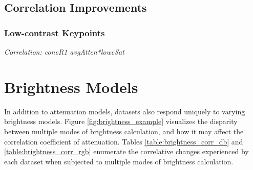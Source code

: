 \documentclass[12pt]{report}
\begin{document}
\subsection{Correlation Improvements}
\subsubsection{Low-contrast Keypoints}
\textit{Correlation: coneR1 avgAtten*lowcSat}

\section{Brightness Models}

In addition to attenuation models, datasets also respond uniquely to varying brightness models. Figure \ref{fig:brightness_example} visualizes the disparity between multiple modes of brightness calculation, and how it may affect the correlation coefficient of attenuation. Tables \ref{table:brightness_corr_db} and \ref{table:brightness_corr_rgb} enumerate the correlative changes experienced by each dataset when subjected to multiple modes of brightness calculation.
\end{document}
